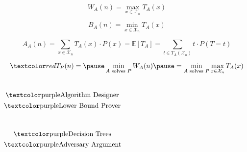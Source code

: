 
\begin{frame}
\end{frame}

\begin{frame}
  \begin{columns}
	  \pause
	  \pause
  \end{columns}
\end{frame}

\begin{frame}{}
  \begin{center}
    {\large {}} \\[8pt]
    {\large {}}
  \end{center}

  \pause
  \[
	W_{A}(n) = \max_{x \in \mathcal{X}_{n}} T_{A}(x)
  \]

  \[
	B_{A}(n) = \min_{x \in \mathcal{X}_{n}} T_{A}(x)
  \]

  \[
	A_{A}(n) = \sum_{x \in \mathcal{X}_{n}} T_{A}(x) \cdot P(x)
		     = \mathbb{E} [T_{A}]
			 = \sum_{t \in T_{A}(\mathcal{X}_{n})} t \cdot P(T = t)
  \]

  \pause
  \vspace{0.40cm}
  \[
	\red{T_{P}(n) = \pause \min_{A \text{ solves } P} W_{A}(n) \pause = \min_{A \text{ solves } P} \max_{x \in \mathcal{X}_{n}} T_{A}(x)}
  \]
\end{frame}

\begin{frame}
  \begin{columns}
	  \[
		\text{\purple{Algorithm Designer}}
	  \]
	\pause
	  \[
		\text{\purple{Lower Bound Prover}}
	  \]
  \end{columns}
\end{frame}

\begin{frame}
  \begin{columns}
	  \[
		\text{\purple{Decision Trees}}
	  \]
	  \[
		\text{\purple{Adversary Argument}}
	  \]
  \end{columns}
\end{frame}

